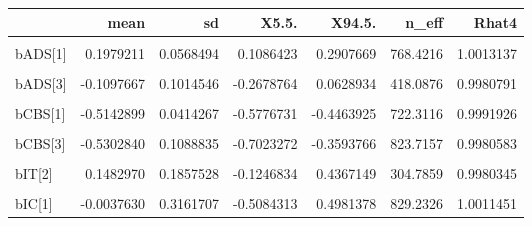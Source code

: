 \documentclass[
  10pt,
  dvipsnames,enabledeprecatedfontcommands]{scrartcl}
\begin{document}
\begin{table}
\centering\begingroup\fontsize{9}{11}\selectfont

\begin{tabular}{lrrrrrr}
\toprule
  & mean & sd & X5.5. & X94.5. & n\_eff & Rhat4\\
\midrule
\cellcolor{gray!6}{a} & \cellcolor{gray!6}{0.0414089} & \cellcolor{gray!6}{0.1562753} & \cellcolor{gray!6}{-0.2037740} & \cellcolor{gray!6}{0.2796946} & \cellcolor{gray!6}{228.1593} & \cellcolor{gray!6}{0.9980513}\\
bADS[1] & 0.1979211 & 0.0568494 & 0.1086423 & 0.2907669 & 768.4216 & 1.0013137\\
\cellcolor{gray!6}{bADS[2]} & \cellcolor{gray!6}{0.2484756} & \cellcolor{gray!6}{0.1546028} & \cellcolor{gray!6}{0.0036955} & \cellcolor{gray!6}{0.4942282} & \cellcolor{gray!6}{526.1494} & \cellcolor{gray!6}{0.9995921}\\
bADS[3] & -0.1097667 & 0.1014546 & -0.2678764 & 0.0628934 & 418.0876 & 0.9980791\\
\cellcolor{gray!6}{bADSIC} & \cellcolor{gray!6}{-0.0042060} & \cellcolor{gray!6}{0.0051643} & \cellcolor{gray!6}{-0.0122338} & \cellcolor{gray!6}{0.0040408} & \cellcolor{gray!6}{361.1195} & \cellcolor{gray!6}{0.9983620}\\
\addlinespace
bCBS[1] & -0.5142899 & 0.0414267 & -0.5776731 & -0.4463925 & 722.3116 & 0.9991926\\
\cellcolor{gray!6}{bCBS[2]} & \cellcolor{gray!6}{-0.0919148} & \cellcolor{gray!6}{0.1245614} & \cellcolor{gray!6}{-0.2965873} & \cellcolor{gray!6}{0.1059034} & \cellcolor{gray!6}{671.6673} & \cellcolor{gray!6}{0.9998084}\\
bCBS[3] & -0.5302840 & 0.1088835 & -0.7023272 & -0.3593766 & 823.7157 & 0.9980583\\
\cellcolor{gray!6}{bIT[1]} & \cellcolor{gray!6}{-0.0212337} & \cellcolor{gray!6}{0.1630179} & \cellcolor{gray!6}{-0.2603815} & \cellcolor{gray!6}{0.2295494} & \cellcolor{gray!6}{219.0190} & \cellcolor{gray!6}{0.9980137}\\
bIT[2] & 0.1482970 & 0.1857528 & -0.1246834 & 0.4367149 & 304.7859 & 0.9980345\\
\addlinespace
\cellcolor{gray!6}{bIT[3]} & \cellcolor{gray!6}{-0.0686005} & \cellcolor{gray!6}{0.1776783} & \cellcolor{gray!6}{-0.3448157} & \cellcolor{gray!6}{0.2099344} & \cellcolor{gray!6}{295.3412} & \cellcolor{gray!6}{0.9980482}\\
bIC[1] & -0.0037630 & 0.3161707 & -0.5084313 & 0.4981378 & 829.2326 & 1.0011451\\

\end{tabular}
\end{table}
\end{document}
